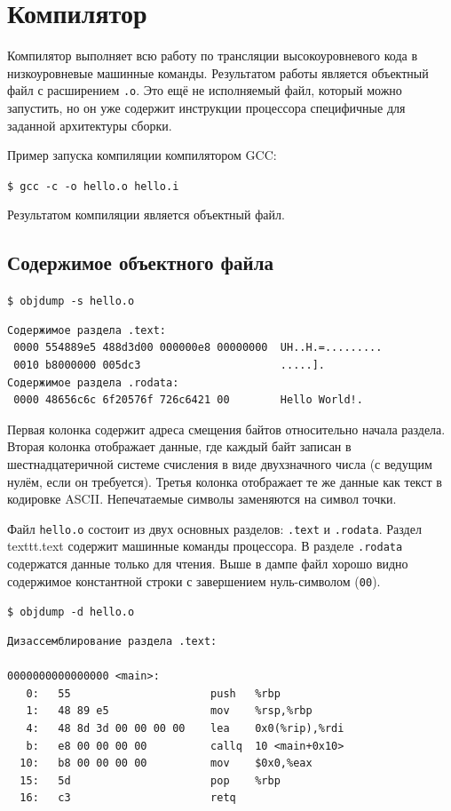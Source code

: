 \documentclass[myc.tex]{subfiles}
\begin{document}
\section{Компилятор}
Компилятор выполняет всю работу по трансляции высокоуровневого кода в низкоуровневые машинные команды. Результатом работы является объектный файл с расширением \texttt{.o}. Это ещё не исполняемый файл, который можно запустить, но он уже содержит инструкции процессора специфичные для заданной архитектуры сборки.

Пример запуска компиляции компилятором GCC:

\texttt{\$ gcc -c -o hello.o hello.i}

Результатом компиляции является объектный файл.



\subsection*{Содержимое объектного файла}


\texttt{\$ objdump -s hello.o}

\begin{small}
\begin{verbatim}
Содержимое раздела .text:
 0000 554889e5 488d3d00 000000e8 00000000  UH..H.=.........
 0010 b8000000 005dc3                      .....].         
Содержимое раздела .rodata:
 0000 48656c6c 6f20576f 726c6421 00        Hello World!.   
\end{verbatim}
\end{small}

Первая колонка содержит адреса смещения байтов относительно начала раздела. Вторая колонка отображает данные, где каждый байт записан в шестнадцатеричной системе счисления в виде двухзначного числа (с ведущим нулём, если он требуется). 
Третья колонка отображает те же данные как текст в кодировке ASCII. Непечатаемые символы заменяются на символ точки.

Файл \texttt{hello.o} состоит из двух основных разделов: \texttt{.text} и \texttt{.rodata}. Раздел texttt{.text} содержит машинные команды процессора. В разделе \texttt{.rodata} содержатся данные только для чтения. Выше в дампе файл хорошо видно содержимое константной строки с завершением нуль-символом (\texttt{00}).

\texttt{\$ objdump -d hello.o}

\begin{small}
\begin{verbatim}
Дизассемблирование раздела .text:

0000000000000000 <main>:
   0:	55                   	push   %rbp
   1:	48 89 e5             	mov    %rsp,%rbp
   4:	48 8d 3d 00 00 00 00 	lea    0x0(%rip),%rdi
   b:	e8 00 00 00 00       	callq  10 <main+0x10>
  10:	b8 00 00 00 00       	mov    $0x0,%eax
  15:	5d                   	pop    %rbp
  16:	c3                   	retq   
\end{verbatim} 
\end{small}
\end{document}
